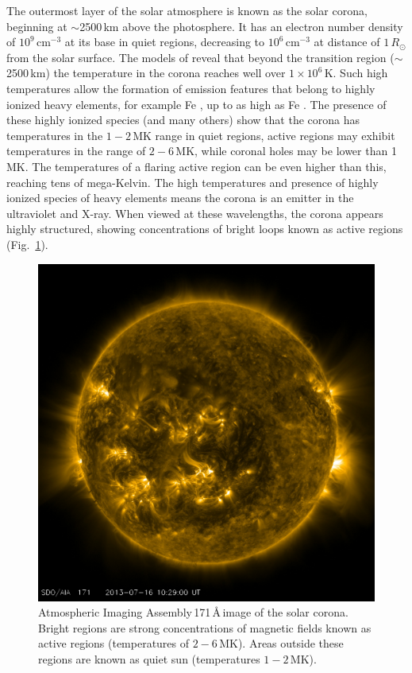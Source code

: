 The outermost layer of the solar atmosphere is known as the solar corona, beginning at $\sim$2500\,km above the photosphere. It has an electron number density of $10^{9}$\,cm$^{-3}$ at its base in quiet regions, decreasing to $10^{6}$\,cm$^{-3}$ at distance of $1\,R_{\odot}$ from the solar surface. The models of \citep{vernazza1981, fontenla1988, gabriel1976} reveal that beyond the transition region ($\sim$2500\,km) the temperature in the corona reaches well over $1\times10^{6}$\,K. Such high temperatures allow the formation of emission features that belong to highly ionized heavy elements, for example Fe , up to as high as Fe . The presence of these highly ionized species (and many others) show that the corona has temperatures in the $1-2$\,MK range in quiet regions, active regions may exhibit temperatures in the range of $2-6$\,MK, while coronal holes may be lower than 1\,MK. The temperatures of a flaring active region can be even higher than this, reaching tens of mega-Kelvin. The high temperatures and presence of highly ionized species of heavy elements means the corona is an emitter in the ultraviolet and X-ray. When viewed at these wavelengths, the corona appears highly structured, showing concentrations of bright loops known as active regions (Fig.~\ref{fig:aia171}).
\begin{figure}[!t]
\begin{center}
\includegraphics[scale=0.15]{images/aia_171}
\caption{Atmospheric Imaging Assembly\,171\,\AA\,image of the solar corona. Bright regions are strong concentrations of magnetic fields known as active regions (temperatures of $2-6$\,MK). Areas outside these regions are known as quiet sun (temperatures $1-2$\,MK).}
\label{fig:aia171} 
\end{center}
\end{figure}


